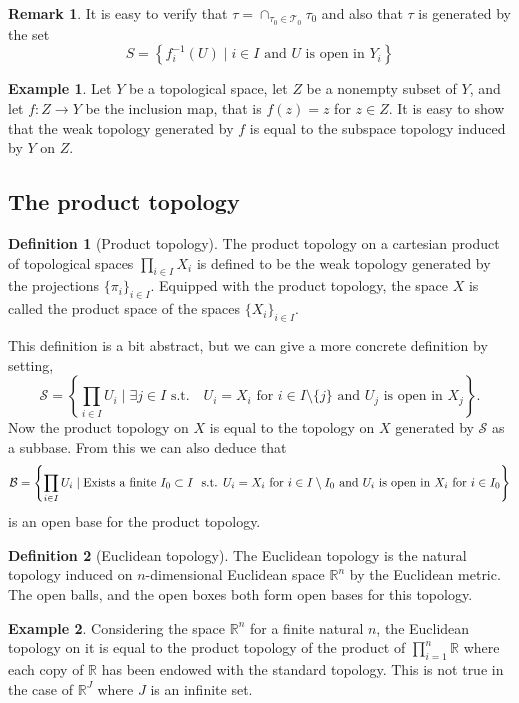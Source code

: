 \documentclass[11pt,a4paper]{article}
\theoremstyle{definition}
\newtheorem{definition}{Definition}[section]
\newtheorem{remark}{Remark}[section]
\newtheorem{example}{Example}[section]
\theoremstyle{plain}
\newcommand{\st}{\text{ s.t. }}
\newcommand{\R}{\mathbb{R}}
\newcommand{\set}[2]{ \left\{ #1 \mid #2 \right\} }
\begin{document}
  \begin{remark}
  It is easy to verify that $\tau = \cap_{\tau_0 \in \mathcal{T}_0}{\tau_0}$
  and also that $\tau$ is generated by the set
  \[
    S = \set{f_i^{-1}(U)}{i \in I \text{ and $U$ is open in $Y_i$}}
  \]
  \end{remark}

  \begin{example}
    Let $Y$ be a topological space, let $Z$ be a nonempty subset of $Y$,
    and let $f \colon Z \to Y$ be the inclusion map, that is $f(z) = z$ 
    for $z \in Z$. It is easy to show that the weak topology generated by $f$ 
    is equal to the subspace topology induced by $Y$ on $Z$.
  \end{example}

  \subsection{The product topology}

  \begin{definition}[Product topology]
    The product topology on a cartesian product of topological spaces
    $\prod_{i \in I} X_i$ is defined to be the weak topology generated by
    the projections $\{\pi_i\}_{i \in I}$. Equipped with the product
    topology, the space $X$ is called the product space of the spaces
    $\{X_i\}_{i \in I}$.
  \end{definition}

  This definition is a bit abstract, but we can give a more concrete 
  definition by setting,
  \[
    \mathcal{S} = \set{\prod_{i \in I}{U_i}}{\exists j \in I \st 
    \text{ $U_i = X_i$ for $i \in I \setminus \{j\}$ and $U_j$ is open in
    $X_j$}}.
  \]
  Now the product topology on $X$ is equal to the topology on $X$ generated
  by $\mathcal{S}$ as a subbase. From this we can also deduce that
  {\small
  \[
    \mathcal{B} = \set{\prod_{i \in I}U_i}{\text{Exists a finite
    $I_0 \subset I$ \st $U_i = X_i$ for $i \in I \setminus I_0$ and
    $U_i$ is open in $X_i$ for $i \in I_0$}}
  \]
  }
  is an open base for the product topology.

  \begin{definition}[Euclidean topology]
    The Euclidean topology is the natural topology induced on $n$-dimensional 
    Euclidean space $\R^n$ by the Euclidean metric. The open balls, and
    the open boxes both form open bases for this topology.
  \end{definition}

  \begin{example}
    Considering the space $\R^n$ for a finite natural $n$, the Euclidean
    topology on it is equal to the product topology of the product of
    $\prod_{i=1}^{n} \R$ where each copy of $\R$ has been endowed with
    the standard topology. This is not true in the case of $\R^J$ where
    $J$ is an infinite set.
  \end{example}
\end{document}

